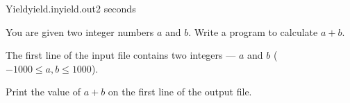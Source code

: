 \begin{problem}{Yield}{yield.in}{yield.out}{2 seconds}

You are given two integer numbers $a$ and $b$. 
Write a program to calculate $a+b$. 

\InputFile

The first line of the input file contains two integers --- $a$ and $b$ 
($-1000 \le a,b \le 1000$).

\OutputFile

Print the value of $a+b$ on the first line of the output file.

\Example

\begin{example}
%
%
\end{example}

\end{problem}
